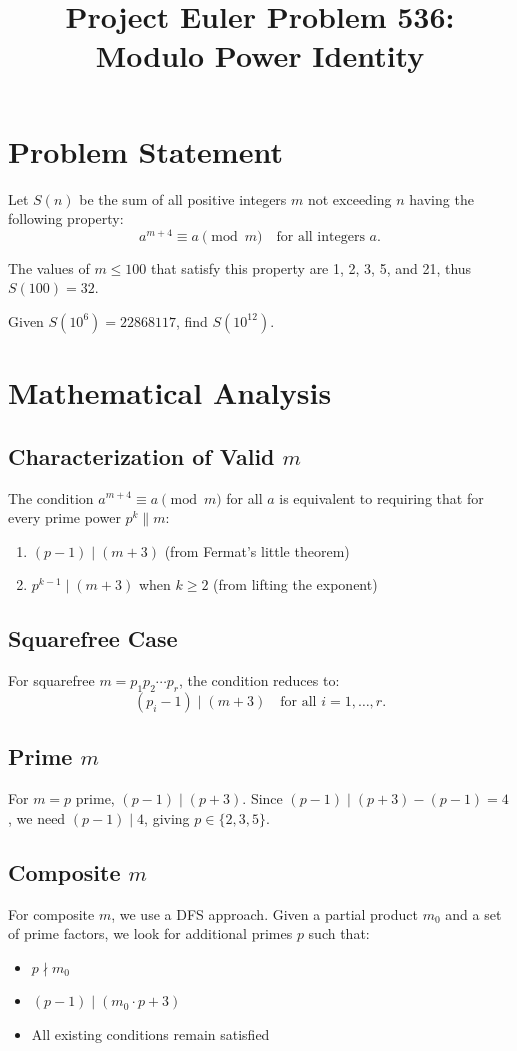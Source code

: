 \documentclass[12pt]{article}
\title{Project Euler Problem 536: Modulo Power Identity}
\author{}
\date{}
\begin{document}
\maketitle

\section{Problem Statement}
Let $S(n)$ be the sum of all positive integers $m$ not exceeding $n$ having the following property:
\[
a^{m+4} \equiv a \pmod{m} \quad \text{for all integers } a.
\]

The values of $m \leq 100$ that satisfy this property are 1, 2, 3, 5, and 21, thus $S(100) = 32$.

Given $S(10^6) = 22868117$, find $S(10^{12})$.

\section{Mathematical Analysis}

\subsection{Characterization of Valid $m$}
The condition $a^{m+4} \equiv a \pmod{m}$ for all $a$ is equivalent to requiring that for every prime power $p^k \| m$:
\begin{enumerate}
    \item $(p-1) \mid (m+3)$ (from Fermat's little theorem)
    \item $p^{k-1} \mid (m+3)$ when $k \geq 2$ (from lifting the exponent)
\end{enumerate}

\subsection{Squarefree Case}
For squarefree $m = p_1 p_2 \cdots p_r$, the condition reduces to:
\[
(p_i - 1) \mid (m+3) \quad \text{for all } i = 1, \ldots, r.
\]

\subsection{Prime $m$}
For $m = p$ prime, $(p-1) \mid (p+3)$. Since $(p-1) \mid (p+3) - (p-1) = 4$, we need $(p-1) \mid 4$, giving $p \in \{2, 3, 5\}$.

\subsection{Composite $m$}
For composite $m$, we use a DFS approach. Given a partial product $m_0$ and a set of prime factors, we look for additional primes $p$ such that:
\begin{itemize}
    \item $p \nmid m_0$
    \item $(p-1) \mid (m_0 \cdot p + 3)$
    \item All existing conditions remain satisfied
\end{itemize}
\end{document}

